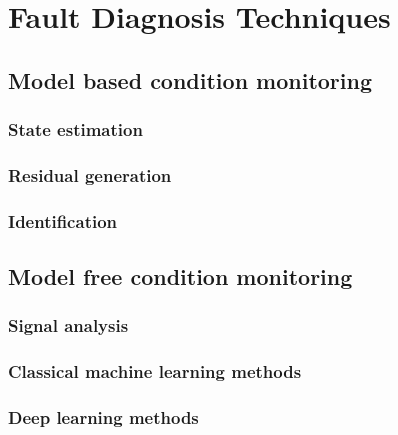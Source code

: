 \section{Fault Diagnosis Techniques}

\subsection{Model based condition monitoring}
\subsubsection{State estimation}
\subsubsection{Residual generation}
\subsubsection{Identification}

\subsection{Model free condition monitoring}
\subsubsection{Signal analysis}
\subsubsection{Classical machine learning methods}
\subsubsection{Deep learning methods}	
	
